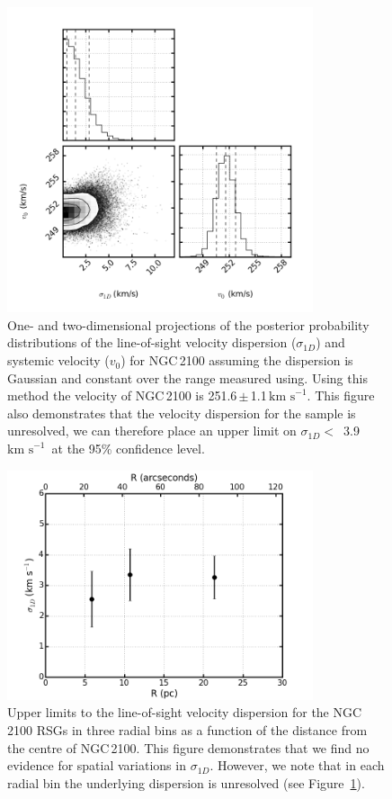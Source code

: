 \documentclass[useAMS,usenatbib]{mn2e}
\def\kms{$\mbox{km s}^{-1}$}
\begin{document}
\begin{figure}
 \includegraphics[width=9.0cm]{NGC2100-sigRV-triangle}
 \caption{One- and two-dimensional projections of the posterior probability distributions of the line-of-sight velocity dispersion ($\sigma_{1D}$) and systemic velocity ($v_{0}$) for NGC\,2100 assuming the dispersion is Gaussian and constant over the range measured using.
 Using this method the velocity of NGC\,2100 is 251.6\,$\pm$\,1.1\,\kms.
 This figure also demonstrates that the velocity dispersion for the sample is unresolved, we can therefore place an upper limit on $\sigma_{1D} <$~3.9\,\kms~at the 95\% confidence level.
\label{fig:sig1d}
          }
\end{figure}

\begin{figure}
 \includegraphics[width=9.0cm]{NGC2100-sig1d-bins}
 \caption{Upper limits to the line-of-sight velocity dispersion for the NGC\,2100 RSGs in three radial bins as a function of the distance from the centre of NGC\,2100.
 This figure demonstrates that we find no evidence for spatial variations in $\sigma_{1D}$.
 However, we note that in each radial bin the underlying dispersion is unresolved (see Figure~\ref{fig:sig1d}).
\label{fig:sig1dbins}
          }
\end{figure}
\end{document}
